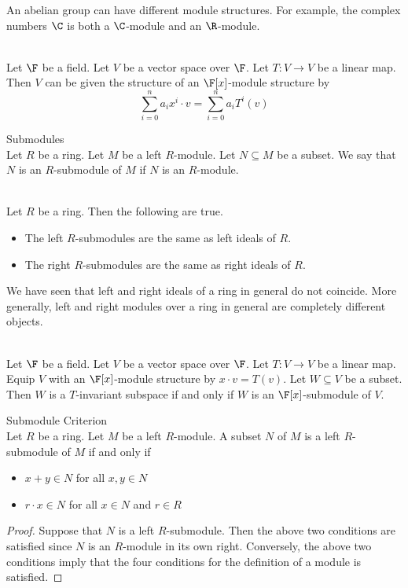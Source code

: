 \documentclass[a4paper]{article}
\begin{document}
An abelian group can have different module structures. For example, the complex numbers $\C$ is both a $\C$-module and an $\R$-module. 

\begin{eg}{}{}\\
Let $\F$ be a field. Let $V$ be a vector space over $\F$. Let $T:V\to V$ be a linear map. Then $V$ can be given the structure of an $\F[x]$-module structure by $$\sum_{i=0}^na_ix^i\cdot v=\sum_{i=0}^na_iT^i(v)$$
\end{eg}

\begin{defn}{Submodules}{}\\
Let $R$ be a ring. Let $M$ be a left $R$-module. Let $N\subseteq M$ be a subset. We say that $N$ is an $R$-submodule of $M$ if $N$ is an $R$-module. 
\end{defn}

\begin{eg}{}{}\\
Let $R$ be a ring. Then the following are true. 
\begin{itemize}
\item The left $R$-submodules are the same as left ideals of $R$. 
\item The right $R$-submodules are the same as right ideals of $R$. 
\end{itemize}
\end{eg}

We have seen that left and right ideals of a ring in general do not coincide. More generally, left and right modules over a ring in general are completely different objects. 

\begin{eg}{}{}\\
Let $\F$ be a field. Let $V$ be a vector space over $\F$. Let $T:V\to V$ be a linear map. Equip $V$ with an $\F[x]$-module structure by $x\cdot v=T(v)$. Let $W\subseteq V$ be a subset. Then $W$ is a $T$-invariant subspace if and only if $W$ is an $\F[x]$-submodule of $V$. 
\end{eg}

\begin{prp}{Submodule Criterion}{}\\
Let $R$ be a ring. Let $M$ be a left $R$-module. A subset $N$ of $M$ is a left $R$-submodule of $M$ if and only if
\begin{itemize}
\item $x+y\in N$ for all $x,y\in N$
\item $r\cdot x\in N$ for all $x\in N$ and $r\in R$
\end{itemize} 
\begin{proof}
Suppose that $N$ is a left $R$-submodule. Then the above two conditions are satisfied since $N$ is an $R$-module in its own right. Conversely, the above two conditions imply that the four conditions for the definition of a module is satisfied. 
\end{proof}
\end{prp}
\end{document}
